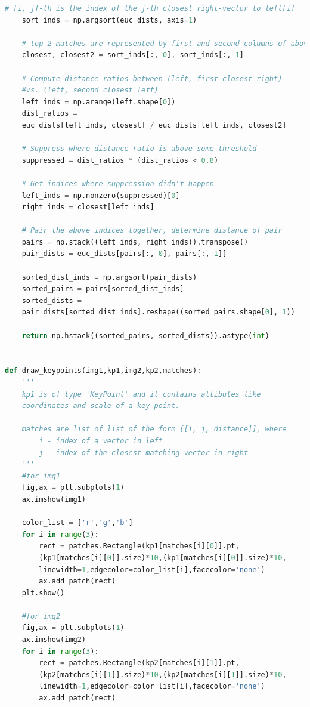 \documentclass{exam}
\begin{document}
\begin{questions}
\begin{parts}
\begin{lstlisting}[language=python, frame=single]
    # [i, j]-th is the index of the j-th closest right-vector to left[i]
    sort_inds = np.argsort(euc_dists, axis=1)
    
    # top 2 matches are represented by first and second columns of above
    closest, closest2 = sort_inds[:, 0], sort_inds[:, 1]
    
    # Compute distance ratios between (left, first closest right) 
    #vs. (left, second closest left)
    left_inds = np.arange(left.shape[0])
    dist_ratios =
    euc_dists[left_inds, closest] / euc_dists[left_inds, closest2]
    
    # Suppress where distance ratio is above some threshold
    suppressed = dist_ratios * (dist_ratios < 0.8)

    # Get indices where suppression didn't happen
    left_inds = np.nonzero(suppressed)[0]
    right_inds = closest[left_inds]
    
    # Pair the above indices together, determine distance of pair
    pairs = np.stack((left_inds, right_inds)).transpose()
    pair_dists = euc_dists[pairs[:, 0], pairs[:, 1]]
    
    sorted_dist_inds = np.argsort(pair_dists)
    sorted_pairs = pairs[sorted_dist_inds]
    sorted_dists =
    pair_dists[sorted_dist_inds].reshape((sorted_pairs.shape[0], 1))
    
    return np.hstack((sorted_pairs, sorted_dists)).astype(int)


def draw_keypoints(img1,kp1,img2,kp2,matches):
    '''
    kp1 is of type 'KeyPoint' and it contains attibutes like
    coordinates and scale of a key point.

    matches are list of list of the form [[i, j, distance]], where
        i - index of a vector in left
        j - index of the closest matching vector in right
    '''
    #for img1
    fig,ax = plt.subplots(1)
    ax.imshow(img1)

    color_list = ['r','g','b']
    for i in range(3):
        rect = patches.Rectangle(kp1[matches[i][0]].pt,
        (kp1[matches[i][0]].size)*10,(kp1[matches[i][0]].size)*10,
        linewidth=1,edgecolor=color_list[i],facecolor='none')
        ax.add_patch(rect)
    plt.show()

    #for img2
    fig,ax = plt.subplots(1)
    ax.imshow(img2)
    for i in range(3):
        rect = patches.Rectangle(kp2[matches[i][1]].pt,
        (kp2[matches[i][1]].size)*10,(kp2[matches[i][1]].size)*10,
        linewidth=1,edgecolor=color_list[i],facecolor='none')
        ax.add_patch(rect)


\end{lstlisting}
\end{parts}
\end{questions}
\end{document}

